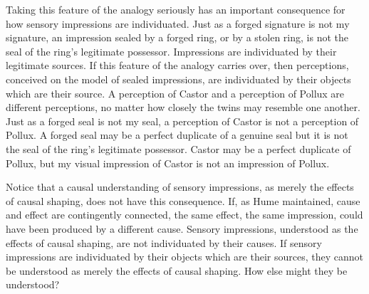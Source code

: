 Taking this feature of the analogy seriously has an important consequence for how sensory impressions are individuated. Just as a forged signature is not my signature, an impression sealed by a forged ring, or by a stolen ring, is not the seal of the ring's legitimate possessor. Impressions are individuated by their legitimate sources. If this feature of the analogy carries over, then perceptions, conceived on the model of sealed impressions, are individuated by their objects which are their source. A perception of Castor and a perception of Pollux are different perceptions, no matter how closely the twins may resemble one another. Just as a forged seal is not my seal, a perception of Castor is not a perception of Pollux. A forged seal may be a perfect duplicate of a genuine seal but it is not the seal of the ring's legitimate possessor. Castor may be a perfect duplicate of Pollux, but my visual impression of Castor is not an impression of Pollux. 

Notice that a causal understanding of sensory impressions, as merely the effects of causal shaping, does not have this consequence. If, as Hume maintained, cause and effect are contingently connected, the same effect, the same impression, could have been produced by a different cause. Sensory impressions, understood as the effects of causal shaping, are not individuated by their causes. If sensory impressions are individuated by their objects which are their sources, they cannot be understood as merely the effects of causal shaping. How else might they be understood?

